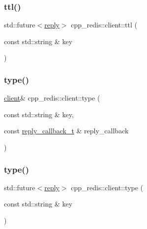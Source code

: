 \mbox{\label{classcpp__redis_1_1client_afc4697ccb77bb16ff13c425b93ef7c1d}} 
\subsubsection{\texorpdfstring{ttl()}{ttl()}\hspace{0.1cm}{\footnotesize\ttfamily [2/2]}}
{\footnotesize\ttfamily std\+::future$<$\hyperlink{classcpp__redis_1_1reply}{reply}$>$ cpp\+\_\+redis\+::client\+::ttl (\begin{DoxyParamCaption}\item[{const std\+::string \&}]{key }\end{DoxyParamCaption})}

\mbox{\label{classcpp__redis_1_1client_ac284ea9a5c0e95d49a675403aaf4847c}} 
\subsubsection{\texorpdfstring{type()}{type()}\hspace{0.1cm}{\footnotesize\ttfamily [1/2]}}
{\footnotesize\ttfamily \hyperlink{classcpp__redis_1_1client}{client}\& cpp\+\_\+redis\+::client\+::type (\begin{DoxyParamCaption}\item[{const std\+::string \&}]{key,  }\item[{const \hyperlink{classcpp__redis_1_1client_a061a1140d36d2eaeda82b09a0bb3f9f2}{reply\+\_\+callback\+\_\+t} \&}]{reply\+\_\+callback }\end{DoxyParamCaption})}

\mbox{\label{classcpp__redis_1_1client_a143f362032218fef03b3408a761b8851}} 
\subsubsection{\texorpdfstring{type()}{type()}\hspace{0.1cm}{\footnotesize\ttfamily [2/2]}}
{\footnotesize\ttfamily std\+::future$<$\hyperlink{classcpp__redis_1_1reply}{reply}$>$ cpp\+\_\+redis\+::client\+::type (\begin{DoxyParamCaption}\item[{const std\+::string \&}]{key }\end{DoxyParamCaption})}

